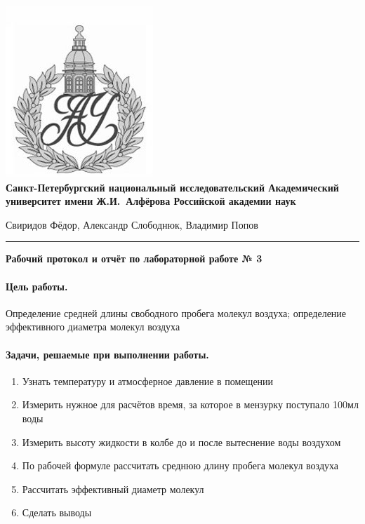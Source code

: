 \documentclass{article}
\begin{document}
\begin{center}
	\includegraphics[scale=0.25]{AU}\\
	{\Large\bfseries Санкт-Петербургский национальный исследовательский Академический университет имени Ж.И.~Алфёрова Российской академии наук}
\end{center}

\begin{center}
	Свиридов Фёдор, Александр Слободнюк, Владимир Попов
\end{center}
\rule{12cm}{0.4mm}
\begin{center}
	{\large\textbf{Рабочий протокол и отчёт по лабораторной работе № 3}}
\end{center}

\paragraph{Цель работы.}
Определение средней длины свободного пробега молекул воздуха; определение эффективного диаметра молекул воздуха

\paragraph{Задачи, решаемые при выполнении работы.}
\begin{enumerate}
	\item Узнать температуру и атмосферное давление в помещении 
	\item Измерить нужное для расчётов время, за которое в мензурку поступало 100мл воды
	\item Измерить высоту жидкости в колбе до и после вытеснение воды воздухом
	\item  По рабочей формуле рассчитать среднюю длину пробега молекул воздуха
	\item  Рассчитать эффективный диаметр молекул
	\item Сделать выводы
\end{enumerate}
\end{document}
